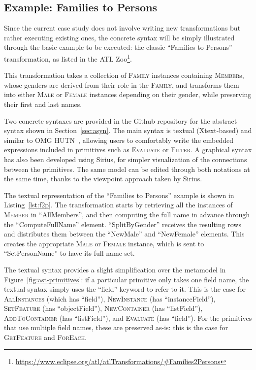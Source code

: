 \documentclass[a4paper]{scrartcl}
\newcommand*{\class}[1]{\textsc{#1}}
\newcommand{\FlowMM}{\emph{FlowM2M}\xspace}
\begin{document}
\subsection{Example: Families to Persons}
\label{sec:f2p}

Since the current case study does not involve writing new
transformations but rather executing existing ones, the concrete
syntax will be simply illustrated through the basic example to be
executed: the classic ``Families to Persons'' transformation, as
listed in the ATL
Zoo\footnote{\url{https://www.eclipse.org/atl/atlTransformations/#Families2Persons}}.

This transformation takes a collection of \class{Family} instances
containing \class{Member}s, whose genders are derived from their role
in the \class{Family}, and transforms them into either \class{Male} or
\class{Female} instances depending on their gender, while preserving
their first and last names.

Two concrete syntaxes are provided in the Github repository for the
abstract syntax shown in Section~\ref{sec:asyn}. The main syntax is
textual (Xtext-based) and similar to OMG HUTN~\cite{hutn2004},
allowing users to comfortably write the embedded expressions included
in primitives such as \class{Evaluate} or \class{Filter}. A graphical
syntax has also been developed using Sirius, for simpler visualization
of the connections between the primitives. The same model can be
edited through both notations at the same time, thanks to the
viewpoint approach taken by Sirius.



The textual representation of the ``Families to Persons'' example is
shown in Listing~\ref{lst:f2p}. The transformation starts by
retrieving all the instances of \class{Member} in ``AllMembers'', and
then computing the full name in advance through the
``ComputeFullName'' element. ``SplitByGender'' receives the resulting
rows and distributes them between the ``NewMale'' and ``NewFemale''
elements. This creates the appropriate \class{Male} or \class{Female}
instance, which is sent to ``SetPersonName'' to have its full name
set.

The textual syntax provides a slight simplification over the metamodel
in Figure~\ref{fig:ast-primitives}: if a particular primitive only
takes one field name, the textual syntax simply uses the ``field''
keyword to refer to it. This is the case for \class{AllInstances}
(which has ``field''), \class{NewInstance} (has ``instanceField''),
\class{SetFeature} (has ``objectField''), \class{NewContainer} (has
``listField''), \class{AddToContainer} (has ``listField''), and
\class{Evaluate} (has ``field''). For the primitives that use multiple
field names, these are preserved as-is: this is the case for
\class{GetFeature} and \class{ForEach}.
\end{document}
